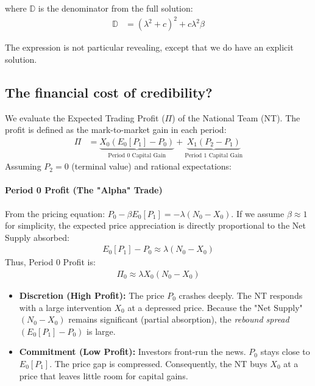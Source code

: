 \documentclass[12pt]{article}
\begin{document}
\noindent where $\mathbb{D}$ is the denominator from the full solution:
\begin{align}
    \mathbb{D} &= (\lambda^2 + c)^2 + c \lambda^2 \beta
\end{align}

The expression is not particular revealing, except that we do have an explicit solution. 

\subsection{The financial cost of credibility?} 

\color{blue}

We evaluate the Expected Trading Profit ($\Pi$) of the National Team (NT). The profit is defined as the mark-to-market gain in each period:
\begin{align}
    \Pi &= \underbrace{X_0 (E_0[P_1] - P_0)}_{\text{Period 0 Capital Gain}} + \underbrace{X_1 (P_2 - P_1)}_{\text{Period 1 Capital Gain}}
\end{align}
Assuming $P_2 = 0$ (terminal value) and rational expectations:

\paragraph{Period 0 Profit (The "Alpha" Trade)}
From the pricing equation: $P_0 - \beta E_0[P_1] = -\lambda (N_0 - X_0)$.
If we assume $\beta \approx 1$ for simplicity, the expected price appreciation is directly proportional to the Net Supply absorbed:
\begin{align}
    E_0[P_1] - P_0 \approx \lambda (N_0 - X_0)
\end{align}
Thus, Period 0 Profit is:
\begin{align}
    \Pi_0 \approx \lambda X_0 (N_0 - X_0)
\end{align}

\begin{itemize}
    \item \textbf{Discretion (High Profit):} The price $P_0$ crashes deeply. The NT responds with a large intervention $X_0$ at a depressed price. Because the "Net Supply" $(N_0 - X_0)$ remains significant (partial absorption), the \textit{rebound spread} $(E_0[P_1] - P_0)$ is large.
    \item \textbf{Commitment (Low Profit):} Investors front-run the news. $P_0$ stays close to $E_0[P_1]$. The price gap is compressed. Consequently, the NT buys $X_0$ at a price that leaves little room for capital gains.
\end{itemize}
\end{document}
